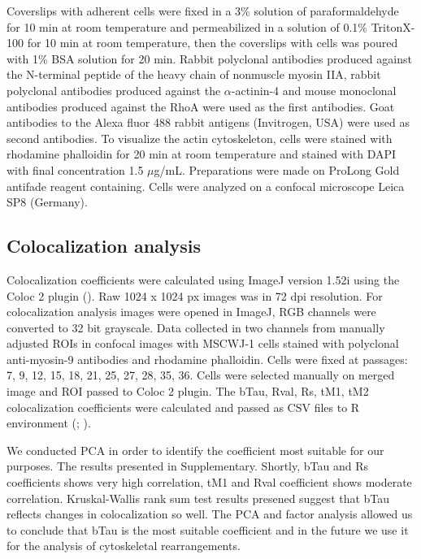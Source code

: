 \documentclass[alpha-refs]{wiley-article}
\begin{document}
Coverslips with adherent cells were fixed in a 3\% solution of paraformaldehyde for 10 min at room temperature and permeabilized in a solution of 0.1\% TritonX-100 for 10 min at room temperature, then the coverslips with cells was poured with 1\% BSA solution for 20 min.
Rabbit polyclonal antibodies produced against the N-terminal peptide of the heavy chain of nonmuscle myosin IIA, rabbit polyclonal antibodies produced against the $\alpha$-actinin-4 and mouse monoclonal antibodies produced against the RhoA were used as the first antibodies.
Goat antibodies to the Alexa fluor 488 rabbit antigens (Invitrogen, USA) were used as second antibodies.
To visualize the actin cytoskeleton, cells were stained with rhodamine phalloidin for 20 min at room temperature and stained with DAPI with final concentration 1.5 $\mu$g/mL.
Preparations were made on ProLong Gold antifade reagent containing.
Cells were analyzed on a confocal microscope Leica SP8 (Germany).


\subsection{Colocalization analysis}

Colocalization coefficients were calculated using ImageJ version 1.52i using the Coloc 2 plugin (\cite{rueden2017imagej2}).
Raw 1024 x 1024 px images was in 72 dpi resolution.
For colocalization analysis images were opened in ImageJ, RGB channels were converted to 32 bit grayscale.
Data collected in two channels from manually adjusted ROIs in confocal images with MSCWJ-1 cells stained with polyclonal anti-myosin-9 antibodies and rhodamine phalloidin. Cells were fixed at passages: 7, 9, 12, 15, 18, 21, 25, 27, 28, 35, 36.
Cells were selected manually on merged image and ROI passed to Coloc 2 plugin.
The bTau, Rval, Rs, tM1, tM2 colocalization coefficients were calculated and passed as CSV files to R environment (\cite{adler2008replicate}; \cite{bergholm2010analysis}).

We conducted PCA in order to identify the coefficient most suitable for our purposes.
The results presented in Supplementary.
Shortly, bTau and Rs coefficients shows very high correlation, tM1 and Rval coefficient shows moderate correlation.
Kruskal-Wallis rank sum test results presened suggest that bTau reflects changes in colocalization so well.
The PCA and factor analysis allowed us to conclude that bTau is the most suitable coefficient and in the future we use it for the analysis of cytoskeletal rearrangements.
\end{document}

